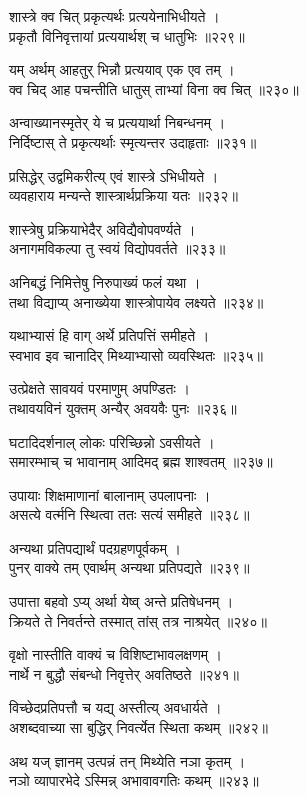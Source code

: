 शास्त्रे क्व चित् प्रकृत्यर्थः प्रत्ययेनाभिधीयते ।\\प्रकृतौ विनिवृत्तायां प्रत्ययार्थश् च धातुभिः ॥२२९॥

यम् अर्थम् आहतुर् भिन्नौ प्रत्ययाव् एक एव तम् ।\\क्व चिद् आह पचन्तीति धातुस् ताभ्यां विना क्व चित् ॥२३०॥

अन्वाख्यानस्मृतेर् ये च प्रत्ययार्था निबन्धनम् ।\\निर्दिष्टास् ते प्रकृत्यर्थाः स्मृत्यन्तर उदाहृताः ॥२३१॥

प्रसिद्धेर् उद्वमिकरीत्य् एवं शास्त्रे ऽभिधीयते ।\\व्यवहाराय मन्यन्ते शास्त्रार्थप्रक्रिया यतः ॥२३२॥

शास्त्रेषु प्रक्रियाभेदैर् अविद्यैवोपवर्ण्यते ।\\अनागमविकल्पा तु स्वयं विद्योपवर्तते ॥२३३॥

अनिबद्धं निमित्तेषु निरुपाख्यं फलं यथा ।\\तथा विद्याप्य् अनाख्येया शास्त्रोपायेव लक्ष्यते ॥२३४॥

यथाभ्यासं हि वाग् अर्थे प्रतिपत्तिं समीहते ।\\स्वभाव इव चानादिर् मिथ्याभ्यासो व्यवस्थितः ॥२३५॥

उत्प्रेक्षते सावयवं परमाणुम् अपण्डितः ।\\तथावयविनं युक्तम् अन्यैर् अवयवैः पुनः ॥२३६॥

घटादिदर्शनाल् लोकः परिच्छिन्नो ऽवसीयते ।\\समारम्भाच् च भावानाम् आदिमद् ब्रह्म शाश्वतम् ॥२३७॥

उपायाः शिक्षमाणानां बालानाम् उपलापनाः ।\\असत्ये वर्त्मनि स्थित्वा ततः सत्यं समीहते ॥२३८॥

अन्यथा प्रतिपद्यार्थं पदग्रहणपूर्वकम् ।\\पुनर् वाक्ये तम् एवार्थम् अन्यथा प्रतिपद्यते ॥२३९॥

उपात्ता बहवो ऽप्य् अर्था येष्व् अन्ते प्रतिषेधनम् ।\\क्रियते ते निवर्तन्ते तस्मात् तांस् तत्र नाश्रयेत् ॥२४०॥

वृक्षो नास्तीति वाक्यं च विशिष्टाभावलक्षणम् ।\\नार्थे न बुद्धौ संबन्धो निवृत्तेर् अवतिष्ठते ॥२४१॥

विच्छेदप्रतिपत्तौ च यद्य् अस्तीत्य् अवधार्यते ।\\अशब्दवाच्या सा बुद्धिर् निवर्त्येत स्थिता कथम् ॥२४२॥

अथ यज् ज्ञानम् उत्पन्नं तन् मिथ्येति नञा कृतम् ।\\नञो व्यापारभेदे ऽस्मिन्न् अभावावगतिः कथम् ॥२४३॥

